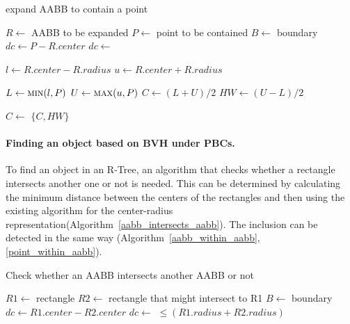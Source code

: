 \documentclass[10pt,letterpaper,twocolumn]{article}
\begin{document}
\begin{algorithm}[tb]
    \caption{expand AABB to contain a point}
    \label{expand_aabb_point}
    \begin{algorithmic}
        \State $R \gets$ AABB to be expanded
        \State $P \gets$ point to be contained
        \State $B \gets$ boundary
            \State $dc \gets P - R.center$
            \State $dc \gets$ 

            \State $l \gets R.center - R.radius$
            \State $u \gets R.center + R.radius$

            \State $L  \gets \Call{min}{l, P}$
            \State $U  \gets \Call{max}{u, P}$
            \State $C  \gets (L + U) / 2$
            \State $HW \gets (U - L) / 2$

            \State $C \gets$ 
            \State \Return $\{C, HW\}$
        \EndFunction
     \end{algorithmic}
\end{algorithm}

\paragraph{Finding an object based on BVH under PBCs.}

To find an object in an R-Tree, an algorithm that checks whether a
rectangle intersects another one or not is needed.
This can be determined by calculating the minimum distance between the centers of
the rectangles and then using the existing algorithm for the center-radius
representation(Algorithm~\ref{aabb_intersects_aabb}).
The inclusion can be detected in the same way
(Algorithm~\ref{aabb_within_aabb}, \ref{point_within_aabb}).

\begin{algorithm}[tb]
    \caption{Check whether an AABB intersects another AABB or not}
    \label{aabb_intersects_aabb}
    \begin{algorithmic}
        \State $R1 \gets$ rectangle
        \State $R2 \gets$ rectangle that might intersect to R1
        \State $B  \gets$ boundary
            \State $dc \gets R1.center - R2.center$
            \State $dc \gets$ 
            \State \Return {} $\leq (R1.radius + R2.radius)$
        \EndFunction
     \end{algorithmic}
\end{algorithm}
\end{document}
